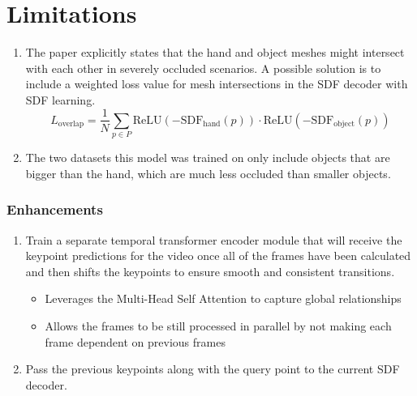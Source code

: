 \documentclass{article}
\begin{document}
\section*{Limitations}

\begin{enumerate}
    \item The paper explicitly states that the hand and object meshes might intersect with each other in severely occluded scenarios. A possible solution is to include a weighted loss value for mesh intersections in the SDF decoder with SDF learning.
    \[L_\text{overlap}=\frac{1}{N}\sum_{p\in P} \text{ReLU}(-\text{SDF}_\text{hand}(p))\cdot \text{ReLU}(-\text{SDF}_\text{object}(p))\]
    \item The two datasets this model was trained on only include objects that are bigger than the hand, which are much less occluded than smaller objects.
\end{enumerate}

\subsubsection*{Enhancements}
\begin{enumerate}
    \item Train a separate temporal transformer encoder module that will receive the keypoint predictions for the video once all of the frames have been calculated and then shifts the keypoints to ensure smooth and consistent transitions.
    \begin{itemize}
        \item Leverages the Multi-Head Self Attention to capture global relationships
        \item Allows the frames to be still processed in parallel by not making each frame dependent on previous frames
    \end{itemize}
    \item Pass the previous keypoints along with the query point to the current SDF decoder.
\end{enumerate}
\end{document}
